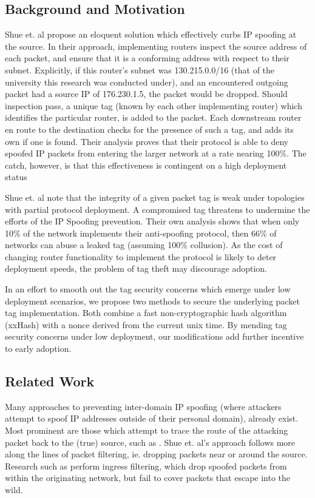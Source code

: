 \documentclass[12pt]{article} %
\begin{document}
\subsection{Background and Motivation}
Shue et. al propose an eloquent solution which effectively curbs IP spoofing at the source. In their approach, implementing routers inspect the source address of each packet, and ensure that it is a conforming address with respect to their subnet\cite{Shue20081567}. Explicitly, if this router's subnet was 130.215.0.0/16 (that of the university this research was conducted under), and an encountered outgoing packet had a source IP of 176.230.1.5, the packet would be dropped. Should inspection pass, a unique tag (known by each other implementing router) which identifies the particular router, is added to the packet. Each downstream router en route to the destination checks for the presence of such a tag, and adds its own if one is found. Their analysis proves that their protocol is able to deny spoofed IP packets from entering the larger network at a rate nearing 100\%. The catch, however, is that this effectiveness is contingent on a high deployment status

Shue et. al note that the integrity of a given packet tag is weak under topologies with partial protocol deployment. A compromised tag threatens to undermine the efforts of the IP Spoofing prevention. Their own analysis shows that when only 10\% of the network implements their anti-spoofing protocol, then 66\% of networks can abuse a leaked tag (assuming 100\% collusion)\cite{Shue20081567}. As the cost of changing router functionality to implement the protocol is likely to deter deployment speeds, the problem of tag theft may discourage adoption.

In an effort to smooth out the tag security concerns which emerge under low deployment scenarios, we propose two methods to secure the underlying packet tag implementation. Both combine a fast non-cryptographic hash algorithm (xxHash) with a nonce derived from the current unix time. By mending tag security concerns under low deployment, our modifications add further incentive to early adoption.

\subsection{Related Work}
Many approaches to preventing inter-domain IP spoofing (where attackers attempt to spoof IP addresses outside of their personal domain), already exist. Most prominent are those which attempt to trace the route of the attacking packet back to the (true) source, such as \cite{Taylor}. Shue et. al's approach follows more along the lines of packet filtering, ie. dropping packets near or around the source. Research such as \cite{rfc2827} perform ingress filtering, which drop spoofed packets from within the originating network, but fail to cover packets that escape into the wild.
\end{document}
